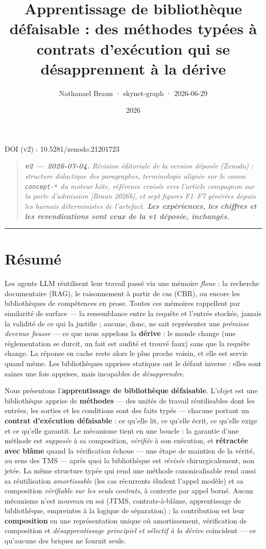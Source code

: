 \documentclass[11pt]{article}
\title{\textbf{Apprentissage de bibliothèque défaisable : des méthodes typées à contrats d'exécution qui se désapprennent à la dérive}}
\author{Nathanael Braun · skynet-graph · 2026-06-29}
\date{2026}
\begin{document}
\maketitle
DOI (v2) : 10.5281/zenodo.21201723

\begin{quote}\itshape \textbf{v2 — 2026-07-04.} Révision éditoriale de la version déposée (Zenodo) : structure didactique des paragraphes, terminologie alignée sur le canon \texttt{concept-*} du moteur hôte, référence croisée vers l'article compagnon sur la porte d'admission [Braun 2026b], et sept figures F1–F7 générées depuis les harnais déterministes de l'artefact. \textbf{Les expériences, les chiffres et les revendications sont ceux de la v1 déposée, inchangés.}\end{quote}

\medskip\hrule\medskip

\section*{Résumé}

Les agents LLM réutilisent leur travail passé via une mémoire \emph{floue} : la recherche documentaire (RAG), le raisonnement à partir de cas (CBR), ou encore les bibliothèques de compétences en prose. Toutes ces mémoires rappellent par similarité de surface — la ressemblance entre la requête et l'entrée stockée, jamais la validité de ce qui la justifie ; aucune, donc, ne sait représenter une \emph{prémisse devenue fausse} — ce que nous appelons la \textbf{dérive} : le monde change (une réglementation se durcit, un fait est audité et trouvé faux) sans que la requête change. La réponse en cache reste alors le plus proche voisin, et elle est servie quand même. Les bibliothèques apprises statiques ont le défaut inverse : elles sont saines une fois apprises, mais incapables de \emph{désapprendre}.

Nous présentons l'\textbf{apprentissage de bibliothèque défaisable}. L'objet est une bibliothèque apprise de \textbf{méthodes} — des unités de travail réutilisables dont les entrées, les sorties et les conditions sont des faits typés — chacune portant un \textbf{contrat d'exécution défaisable} : ce qu'elle lit, ce qu'elle écrit, ce qu'elle exige et ce qu'elle garantit. Le mécanisme tient en une boucle : la garantie d'une méthode est \emph{supposée} à sa composition, \emph{vérifiée} à son exécution, et \textbf{rétractée avec blâme} quand la vérification échoue — une étape de maintien de la vérité, au sens des TMS — après quoi la bibliothèque est \emph{révisée} chirurgicalement, non jetée. La même structure typée qui rend une méthode canonicalisable rend aussi sa réutilisation \emph{amortissable} (les cas récurrents éludent l'appel modèle) et sa composition \emph{vérifiable sur les seuls contrats}, à contexte par appel borné. Aucun mécanisme n'est nouveau en soi (JTMS, contrats-à-blâme, apprentissage de bibliothèque, empreintes à la logique de séparation) ; la contribution est leur \textbf{composition} en une représentation unique où amortissement, vérification de composition et \emph{désapprentissage principiel et sélectif à la dérive} coïncident — ce qu'aucune des briques ne fournit seule.
\end{document}
